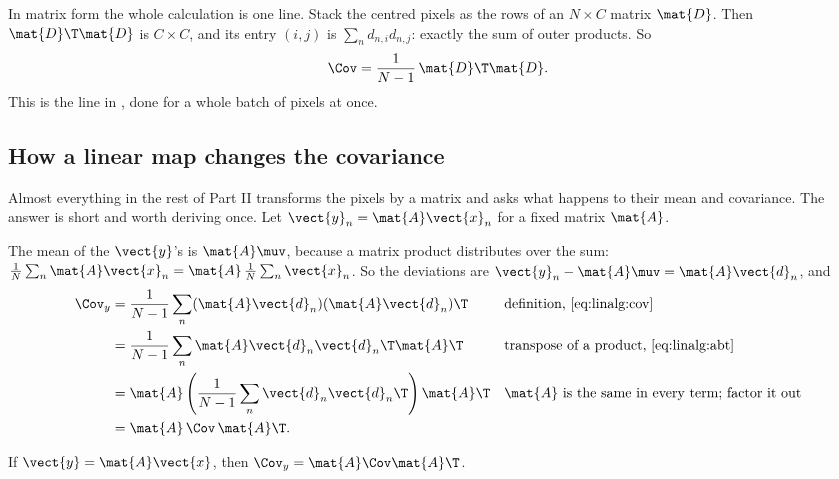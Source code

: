 In matrix form the whole calculation is one line. Stack the centred pixels as the rows of an
$N \times C$ matrix $\mat{D}$. Then $\mat{D}\T\mat{D}$ is $C\times C$, and its entry $(i,j)$ is
$\sum_n d_{n,i}d_{n,j}$: exactly the sum of outer products. So
\begin{equation}\label{eq:linalg:covmat}
\Cov = \frac{1}{N-1}\,\mat{D}\T\mat{D}.
\end{equation}
This is the line  in
, done for a whole batch of pixels at once.

\subsection{How a linear map changes the covariance}

Almost everything in the rest of Part II transforms the pixels by a matrix and asks what
happens to their mean and covariance. The answer is short and worth deriving once. Let
$\vect{y}_n = \mat{A}\vect{x}_n$ for a fixed matrix $\mat{A}$.

The mean of the $\vect{y}$'s is $\mat{A}\muv$, because a matrix product distributes over the sum:
$\frac1N\sum_n\mat{A}\vect{x}_n = \mat{A}\,\frac1N\sum_n\vect{x}_n$. So the deviations are
$\vect{y}_n - \mat{A}\muv = \mat{A}\vect{d}_n$, and
\begin{align}
\Cov_y &= \frac{1}{N-1}\sum_n (\mat{A}\vect{d}_n)(\mat{A}\vect{d}_n)\T
  && \text{definition, \cref{eq:linalg:cov}} \notag\\
&= \frac{1}{N-1}\sum_n \mat{A}\vect{d}_n\vect{d}_n\T\mat{A}\T
  && \text{transpose of a product, \cref{eq:linalg:abt}} \notag\\
&= \mat{A}\left(\frac{1}{N-1}\sum_n \vect{d}_n\vect{d}_n\T\right)\mat{A}\T
  && \text{$\mat{A}$ is the same in every term; factor it out} \notag\\
&= \mat{A}\,\Cov\,\mat{A}\T . \label{eq:linalg:covtransform}
\end{align}

\begin{keypoint}
If $\vect{y} = \mat{A}\vect{x}$, then $\Cov_y = \mat{A}\Cov\mat{A}\T$.
\end{keypoint}

